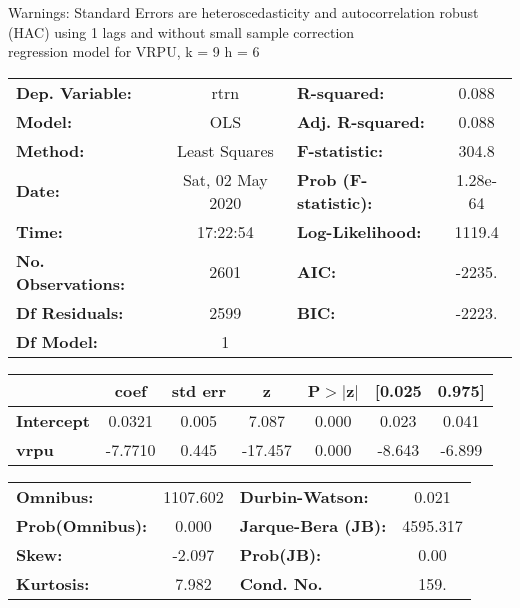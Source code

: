 Warnings: \newline
 [1] Standard Errors are heteroscedasticity and autocorrelation robust (HAC) using 1 lags and without small sample correction\\ 

regression model for VRPU, k = 9 h = 6\begin{center}
\begin{tabular}{lclc}
\toprule
\textbf{Dep. Variable:}    &       rtrn       & \textbf{  R-squared:         } &     0.088   \\
\textbf{Model:}            &       OLS        & \textbf{  Adj. R-squared:    } &     0.088   \\
\textbf{Method:}           &  Least Squares   & \textbf{  F-statistic:       } &     304.8   \\
\textbf{Date:}             & Sat, 02 May 2020 & \textbf{  Prob (F-statistic):} &  1.28e-64   \\
\textbf{Time:}             &     17:22:54     & \textbf{  Log-Likelihood:    } &    1119.4   \\
\textbf{No. Observations:} &        2601      & \textbf{  AIC:               } &    -2235.   \\
\textbf{Df Residuals:}     &        2599      & \textbf{  BIC:               } &    -2223.   \\
\textbf{Df Model:}         &           1      & \textbf{                     } &             \\
\bottomrule
\end{tabular}
\begin{tabular}{lcccccc}
                   & \textbf{coef} & \textbf{std err} & \textbf{z} & \textbf{P$> |$z$|$} & \textbf{[0.025} & \textbf{0.975]}  \\
\midrule
\textbf{Intercept} &       0.0321  &        0.005     &     7.087  &         0.000        &        0.023    &        0.041     \\
\textbf{vrpu}      &      -7.7710  &        0.445     &   -17.457  &         0.000        &       -8.643    &       -6.899     \\
\bottomrule
\end{tabular}
\begin{tabular}{lclc}
\textbf{Omnibus:}       & 1107.602 & \textbf{  Durbin-Watson:     } &    0.021  \\
\textbf{Prob(Omnibus):} &   0.000  & \textbf{  Jarque-Bera (JB):  } & 4595.317  \\
\textbf{Skew:}          &  -2.097  & \textbf{  Prob(JB):          } &     0.00  \\
\textbf{Kurtosis:}      &   7.982  & \textbf{  Cond. No.          } &     159.  \\
\bottomrule
\end{tabular}
\end{center}

